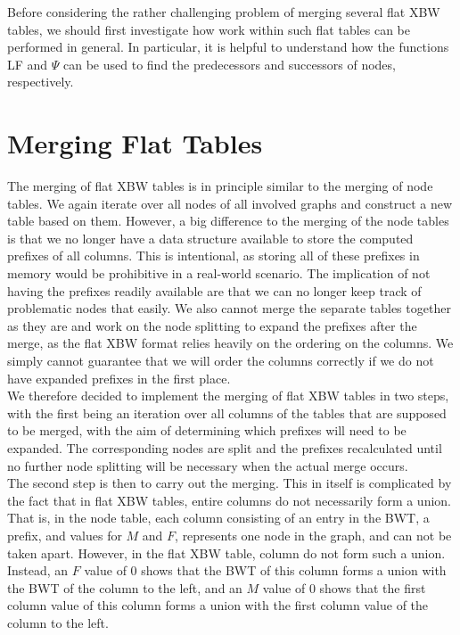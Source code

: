 \documentclass[a4paper,12pt,twoside,BCOR=10mm]{scrbook}
\begin{document}
Before considering the rather challenging problem of merging several flat XBW tables, 
we should first investigate how work within such flat tables can be performed in general. 
In particular, it is helpful to understand how 
the functions LF and $ \Psi $ can be used to find the predecessors and successors 
of nodes, respectively.

\section{Merging Flat Tables}
%

The merging of flat XBW tables is in principle similar to the merging of node tables. 
We again iterate over all nodes of all involved graphs and construct a new table 
based on them. 
However, a big difference to the merging of the node tables is that we no longer have 
a data structure available to store the computed prefixes of all columns. 
This is intentional, as storing all of these prefixes in memory would be prohibitive 
in a real-world scenario. The implication of not having the prefixes readily available 
are that we can no longer keep track of problematic nodes that easily. 
We also cannot merge the separate tables together as they are and work on the node splitting to expand the prefixes 
after the merge, as the flat XBW format relies heavily on the ordering on the columns. 
We simply cannot guarantee that we will order the columns correctly 
if we do not have expanded prefixes in the first place. \\
We therefore decided to implement the merging of flat XBW tables in two steps, 
with the first being an iteration over all columns of the tables that are supposed to be merged, 
with the aim of determining which prefixes will need to be expanded. The corresponding nodes are 
split and the prefixes recalculated until no further node splitting will be necessary when the actual 
merge occurs. \\
The second step is then to carry out the merging. This in itself is complicated by the fact 
that in flat XBW tables, entire columns do not necessarily form a union. That is, 
in the node table, each column consisting of an entry in the BWT, a prefix, and values for $ M $ and $ F $, 
represents one node in the graph, and can not be taken apart. 
However, in the flat XBW table, column do not form such a union. 
Instead, an $ F $ value of 0 shows that the BWT of this column forms a union with the BWT of the column to the left, 
and an $ M $ value of 0 shows that the first column value of this column forms a union 
with the first column value of the column to the left.
\end{document}
